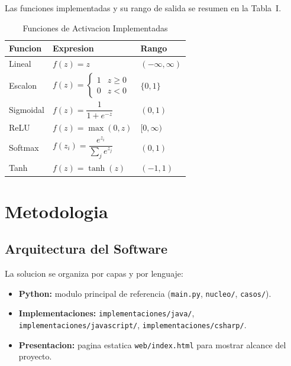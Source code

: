 \documentclass[10pt,twocolumn,a4paper]{article}
\begin{document}
Las funciones implementadas y su rango de salida se resumen en la
Tabla~I.

\begin{table}[t]
\caption{Funciones de Activacion Implementadas}
\label{tab:activaciones}
\centering
\small
\begin{tabular}{p{1.5cm}|p{3.2cm}|p{1.3cm}}
\hline
\textbf{Funcion} & \textbf{Expresion} & \textbf{Rango} \\
\hline
Lineal     & $f(z) = z$ & $(-\infty,\infty)$ \\
\hline
Escalon    & $f(z) = \begin{cases}1 & z \ge 0\\0 & z < 0\end{cases}$ & $\{0,1\}$ \\
\hline
Sigmoidal  & $f(z) = \dfrac{1}{1+e^{-z}}$ & $(0,1)$ \\
\hline
ReLU       & $f(z) = \max(0, z)$ & $[0,\infty)$ \\
\hline
Softmax    & $f(z_i) = \dfrac{e^{z_i}}{\sum_j e^{z_j}}$ & $(0,1)$ \\
\hline
Tanh       & $f(z) = \tanh(z)$ & $(-1,1)$ \\
\hline
\end{tabular}
\end{table}

\section{Metodologia}

\subsection{Arquitectura del Software}

La solucion se organiza por capas y por lenguaje:
\begin{itemize}
  \item \textbf{Python:} modulo principal de referencia
  (\texttt{main.py}, \texttt{nucleo/}, \texttt{casos/}).
  \item \textbf{Implementaciones:}
  \texttt{implementaciones/java/},
  \texttt{implementaciones/javascript/},
  \texttt{implementaciones/csharp/}.
  \item \textbf{Presentacion:} pagina estatica
  \texttt{web/index.html} para mostrar alcance del proyecto.
\end{itemize}
\end{document}
